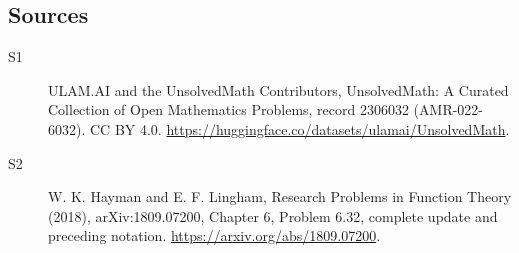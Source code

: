 \documentclass[11pt]{article}
\begin{document}
\subsection{Sources}
\begin{description}
\item[\hypertarget{source:2306032:1}{S1}] ULAM.AI and the UnsolvedMath Contributors, UnsolvedMath: A Curated Collection of Open Mathematics Problems, record 2306032 (AMR-022-6032). CC BY 4.0. \url{https://huggingface.co/datasets/ulamai/UnsolvedMath}.
\item[\hypertarget{source:2306032:2}{S2}] W. K. Hayman and E. F. Lingham, Research Problems in Function Theory (2018), arXiv:1809.07200, Chapter 6, Problem 6.32, complete update and preceding notation. \url{https://arxiv.org/abs/1809.07200}.
\end{description}
\label{end:2306032}
\end{document}
